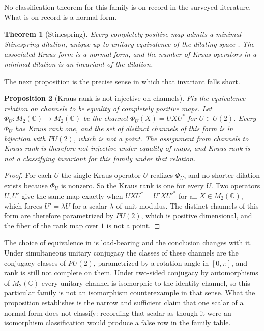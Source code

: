 \documentclass[11pt,letterpaper]{article}
\newtheorem{theorem}{Theorem}[section]
\newtheorem{proposition}[theorem]{Proposition}
\theoremstyle{definition}
\theoremstyle{remark}
\begin{document}
No classification theorem for this family is on record in the surveyed literature. What is on record is a normal form.

\begin{theorem}[Stinespring]
\label{thm:stinespring}
Every completely positive map admits a minimal Stinespring dilation, unique up to unitary equivalence of the dilating space \cite{stinespring-primary}. The associated Kraus form is a normal form, and the number of Kraus operators in a minimal dilation is an invariant of the dilation.
\end{theorem}

The next proposition is the precise sense in which that invariant falls short.

\begin{proposition}[Kraus rank is not injective on channels]
\label{prop:kraus}
Fix the equivalence relation on channels to be equality of completely positive maps. Let $\Phi_U \colon M_2(\mathbb{C}) \to M_2(\mathbb{C})$ be the channel $\Phi_U(X) = U X U^*$ for $U \in U(2)$. Every $\Phi_U$ has Kraus rank one, and the set of distinct channels of this form is in bijection with $PU(2)$, which is not a point. The assignment from channels to Kraus rank is therefore not injective under equality of maps, and Kraus rank is not a classifying invariant for this family under that relation.
\end{proposition}

\begin{proof}
For each $U$ the single Kraus operator $U$ realizes $\Phi_U$, and no shorter dilation exists because $\Phi_U$ is nonzero. So the Kraus rank is one for every $U$. Two operators $U, U'$ give the same map exactly when $UXU^* = U'XU'^*$ for all $X \in M_2(\mathbb{C})$, which forces $U' = \lambda U$ for a scalar $\lambda$ of unit modulus. The distinct channels of this form are therefore parametrized by $PU(2)$, which is positive dimensional, and the fiber of the rank map over $1$ is not a point.
\end{proof}

The choice of equivalence in  is load-bearing and the conclusion changes with it. Under simultaneous unitary conjugacy the classes of these channels are the conjugacy classes of $PU(2)$, parametrized by a rotation angle in $[0, \pi]$, and rank is still not complete on them. Under two-sided conjugacy by automorphisms of $M_2(\mathbb{C})$ every unitary channel is isomorphic to the identity channel, so this particular family is not an isomorphism counterexample in that sense. What the proposition establishes is the narrow and sufficient claim that one scalar of a normal form does not classify: recording that scalar as though it were an isomorphism classification would produce a false row in the family table.
\end{document}
